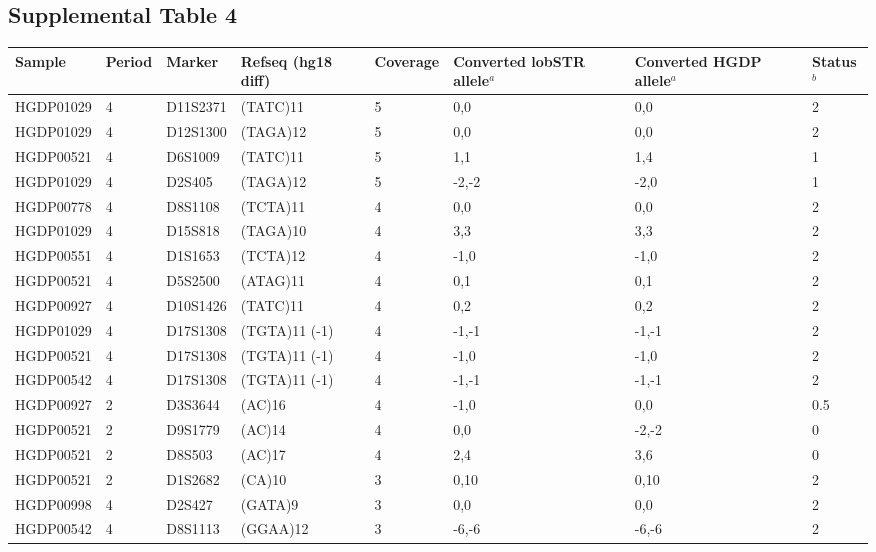 \pagebreak

\subsection{Supplemental Table 4}
\begin{table}[h!]
\centering
\label{tab:lobsuptab4}
\begin{adjustbox}{width=1\textwidth,height=0.5\textwidth}
\begin{tabular}{l l l l l l l l  }
\hline
Sample & Period & Marker & Refseq (hg18 diff) & Coverage & Converted lobSTR allele$^a$ & Converted HGDP allele$^a$ & Status$^b$ \\ 
\hline
HGDP01029 & 4 & D11S2371 & (TATC)11 & 5 & 0,0   & 0,0   & 2   \\
HGDP01029 & 4 & D12S1300 & (TAGA)12 & 5 & 0,0   & 0,0   & 2   \\
HGDP00521 & 4 & D6S1009  & (TATC)11 & 5 & 1,1   & 1,4   & 1   \\
HGDP01029 & 4 & D2S405   & (TAGA)12 & 5 & -2,-2 & -2,0  & 1   \\
HGDP00778 & 4 & D8S1108  & (TCTA)11 & 4 & 0,0   & 0,0   & 2   \\
HGDP01029 & 4 & D15S818  & (TAGA)10 & 4 & 3,3   & 3,3   & 2   \\
HGDP00551 & 4 & D1S1653  & (TCTA)12 & 4 & -1,0  & -1,0  & 2   \\
HGDP00521 & 4 & D5S2500  & (ATAG)11 & 4 & 0,1   & 0,1   & 2   \\
HGDP00927 & 4 & D10S1426 & (TATC)11 & 4 & 0,2   & 0,2   & 2   \\
HGDP01029 & 4 & D17S1308 & (TGTA)11 (-1)& 4 & -1,-1 & -1,-1 & 2   \\
HGDP00521 & 4 & D17S1308 & (TGTA)11 (-1)& 4 & -1,0  & -1,0  & 2   \\
HGDP00542 & 4 & D17S1308 & (TGTA)11 (-1) & 4 & -1,-1 & -1,-1 & 2   \\
HGDP00927 & 2 & D3S3644  & (AC)16   & 4 & -1,0  & 0,0   & 0.5 \\
HGDP00521 & 2 & D9S1779  & (AC)14   & 4 & 0,0   & -2,-2 & 0   \\
HGDP00521 & 2 & D8S503   & (AC)17   & 4 & 2,4   & 3,6   & 0   \\
HGDP00521 & 2 & D1S2682  & (CA)10   & 3 & 0,10  & 0,10  & 2   \\
HGDP00998 & 4 & D2S427   & (GATA)9  & 3 & 0,0   & 0,0   & 2   \\
HGDP00542 & 4 & D8S1113  & (GGAA)12 & 3 & -6,-6 & -6,-6 & 2   \\

\end{tabular}
\end{adjustbox}
\end{table}
